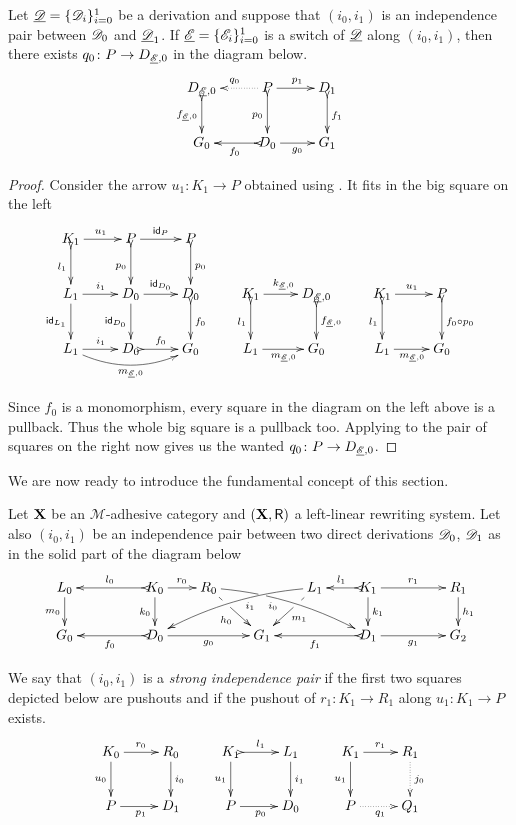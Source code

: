 \begin{corollary}\label{lem:cose}Let
		$\underline{\mathscr{D}}=\{\mathscr{D}_i\}_{i=0}^1$ be a derivation and suppose
		that $(i_0, i_1)$ is an independence pair between $\mathscr{D}_0$
		and $\underline{\mathscr{D}}_1$.  If $\underline{\mathscr{E}}=\{\mathscr{E}_i\}_{i=0}^1$ is a
		switch of $\underline{\mathscr{D}}$ along $(i_0, i_1)$, then there exists
		$q_0\colon P\to D_{\underline{\mathscr{E}},0}$ in the diagram below. 
		\[\xymatrix{D_{\der{E},0} \ar@{>->}[d]_{f_{\der{E},0}}&P
			\ar@{.>}[l]_{q_0} \ar[r]^{p_1} \ar@{>->}[d]_{p_0}& D_1
			\ar@{>->}[d]^{f_1}\\ G_{0}&D_0 \ar@{>->}[l]^{f_0}\ar[r]_{g_0}&
			G_1}\]
		\end{corollary}
\begin{proof}
	Consider the arrow $u_1\colon K_1\to P$ obtained using
	. It fits in the big square on the left
	\[		\xymatrix{K_1 \ar[r]^{u_1} \ar@{>->}[d]_{l_1}&P
		\ar[r]^{\id{P}}\ar@{>->}[d]_{p_0}& P\ar@{>->}[d]^{p_0}\\L_1
		\ar[d]_{\id{L_1}}\ar[r]^{i_1}&D_0 \ar[r]^{\id{D_0}}
		\ar[d]_{\id{D_0}}& D_{0} \ar@{>->}[d]^{f_0}&K_1 \ar@{>->}[d]_{l_1}\ar[r]^{k_{\der{E},0}}&
		D_{\der{E},0} \ar@{>->}[d]^{f_{\der{E},0}} & K_1 \ar[r]^{u_1}
		\ar@{>->}[d]_{l_1}& P \ar@{>->}[d]^{f_0\circ
			p_0}\\
		L_1\ar[r]^{i_1} \ar@/_.4cm/[rr]_{m_{\der{E},0}}&D_0
		\ar@{>->}[r]^{f_0}&G_0 & L_1\ar[r]_{m_{\der{E},0}}&G_0 &L_1
		\ar[r]_{m_{\der{E},0}}&G_0}\]
	
	Since $f_0$ is a monomorphism, every square in the diagram on the left above
	is a pullback. Thus the whole big square is a pullback too.
	Applying  to the pair of squares on the right now gives
	us the wanted $q_0\colon P\to D_{\underline{\mathscr{E}},0}$.
\end{proof}


We are now ready to introduce the fundamental concept of this section.

\begin{definition}
	\label{def:strong}
	Let $\textbf {\textup{X}}$ be an $\mathcal{M}$-adhesive category 
	and $(\textbf {\textup{X}}, \mathsf{R})$ a left-linear rewriting system. 
	Let also $(i_0, i_1)$ be an independence pair between two direct
	derivations $\mathscr{D}_0$, $\mathscr{D}_1$
	as in the solid part of the diagram below
	\[\xymatrix@R=20pt@C=20pt{L_0 \ar[d]_{m_0}&& K_0
	\ar[d]_{k_0}\ar@{>->}[ll]_{l_0} \ar[r]^{r_0} & R_0
	\ar@/^.25cm/[drrr]|(.32)\hole_(.4){i_0}
	\ar[dr]|(.33)\hole_{h_0} && L_1 \ar@/_.25cm/[dlll]^(.4){i_1}
	\ar[dl]|(.33)\hole^{m_1}& K_1 \ar[d]^{k_1}\ar@{>->}[l]_{l_1}
	\ar[rr]^{r_1} && R_1 \ar[d]^{h_1}\\G_0 && \ar@{>->}[ll]^{f_0}
	D_0 \ar[rr]_{g_0}&& G_1 && \ar@{>->}[ll]^{f_1} D_1
	\ar[rr]_{g_1}&& G_2}
\]
	
	We say that $(i_0, i_1)$ is a \emph{strong independence pair} if
	the first two squares depicted  
	below are pushouts and if the pushout of $r_1 : K_1 \to R_1$ along $u_1 : K_1 \to P$ exists.
	\[
	\xymatrix{
		K_0 \ar[r]^{r_0} \ar[d]_{u_0}& R_0 \ar[d]^{i_0} & K_1
		\ar@{>->}[r]^{l_1} \ar[d]_{u_1}& L_1 \ar[d]^{i_1}
		&K_1 \ar[r]^{r_1} \ar[d]_{u_1}& R_1\ar@{.>}[d]^{j_0}
		\\
		P \ar[r]_{p_1} & D_1 &P \ar[r]_{p_0} & D_0
		& P \ar@{.>}[r]_{q_1} & Q_1
	}
	\]
\end{definition}

